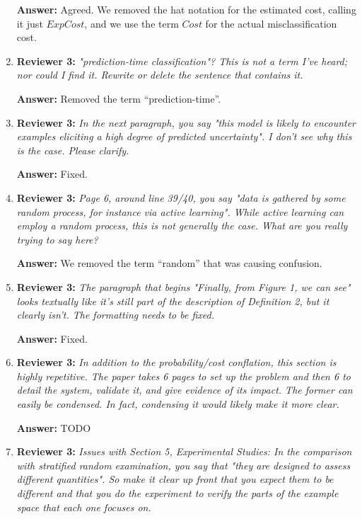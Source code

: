 \documentclass[letterpaper]{article}
\begin{document}
\begin{enumerate}
\textbf{Answer:} Agreed. We removed the hat notation for the estimated cost, calling it just $\mathit{ExpCost}$, and we use the term $\mathit{Cost}$ for the actual misclassification cost.

\item \textbf{Reviewer 3:} \emph{ "prediction-time classification"?  This is not a term I've heard; nor could I find it.  Rewrite or delete the sentence that contains it.}

\textbf{Answer:} Removed the term ``prediction-time''.

\item \textbf{Reviewer 3:} \emph{ In the next paragraph, you say "this model is likely to encounter examples eliciting a high degree of predicted uncertainty".  I don't see why this is the case.  Please clarify.}

\textbf{Answer:} Fixed.

\item \textbf{Reviewer 3:} \emph{ Page 6, around line 39/40, you say "data is gathered by some random process, for instance via active learning".  While active learning can employ a random process, this is not generally the case.  What are you really trying to say here?}

\textbf{Answer:} We removed the term ``random'' that was causing confusion.

\item \textbf{Reviewer 3:} \emph{ The paragraph that begins "Finally, from Figure 1, we can see" looks textually like it's still part of the description of Definition 2, but it clearly isn't. The formatting needs to be fixed.}

\textbf{Answer:} Fixed.

\item \textbf{Reviewer 3:} \emph{ In addition to the probability/cost conflation, this section is highly repetitive.  The paper takes 6 pages to set up the problem and then 6 to detail the system, validate it, and give evidence of its impact.  The former can easily be condensed.  In fact, condensing it would likely make it more clear.}

\textbf{Answer:} TODO

\item \textbf{Reviewer 3:} \emph{Issues with Section 5, Experimental Studies: In the comparison with stratified random examination, you say that "they are designed to assess different quantities".  So make it clear up front that you expect them to be different and that you do the experiment to verify the parts of the example space that each one focuses on.}


\end{enumerate}
\end{document}
